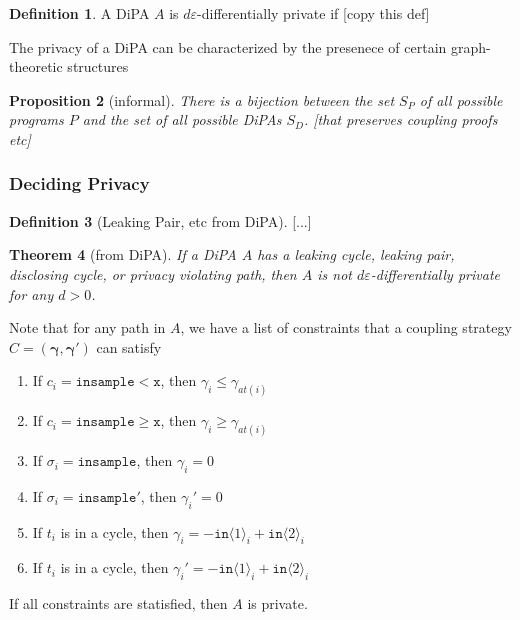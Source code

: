 \documentclass[12pt]{article}
\newcommand{\gguard}[1][x]{\texttt{insample}\geq #1}
\newcommand{\lguard}[1][x]{\texttt{insample} < #1}
\newcommand{\brangle}[1]{\langle #1 \rangle}
\newtheorem{thm}{Theorem}[section]
\newtheorem{prop}[thm]{Proposition}
\theoremstyle{definition}
\newtheorem{defn}[thm]{Definition}
\begin{document}
\begin{defn}
    A DiPA $A$ is $d\varepsilon$-differentially private if [copy this def]
\end{defn}

The privacy of a DiPA can be characterized by the presenece of certain graph-theoretic structures


\begin{prop}[informal]
    There is a bijection between the set $S_P$ of all possible programs $P$ and the set of all possible DiPAs $S_D$. [that preserves coupling proofs etc]
\end{prop}


\subsubsection{Deciding Privacy}


\begin{defn}[Leaking Pair, etc from DiPA]
    [...]
\end{defn}

\begin{thm}[from DiPA]\label{DiPACounterexamplesThm}
    If a DiPA $A$ has a leaking cycle, leaking pair, disclosing cycle, or privacy violating path, then $A$ is not $d\varepsilon$-differentially private for any $d>0$. 
\end{thm}

Note that for any path in $A$, we have a list of constraints that a coupling strategy $C=(\mathbf{\gamma}, \mathbf{\gamma}')$ can satisfy\begin{enumerate}
    \item If $c_i = \lguard[\texttt{x}]$, then $\gamma_i\leq\gamma_{at(i)}$
    \item If $c_i = \gguard[\texttt{x}]$, then $\gamma_i\geq\gamma_{at(i)}$
    \item If $\sigma_i = \texttt{insample}$, then $\gamma_i=0$
    \item If $\sigma_i = \texttt{insample}'$, then $\gamma_i'=0$
    \item If $t_i$ is in a cycle, then $\gamma_i = -\texttt{in}\brangle{1}_i+\texttt{in}\brangle{2}_i$
    \item If $t_i$ is in a cycle, then $\gamma_i' = -\texttt{in}\brangle{1}_i+\texttt{in}\brangle{2}_i$
\end{enumerate}

If all constraints are statisfied, then $A$ is private. 
\end{document}
